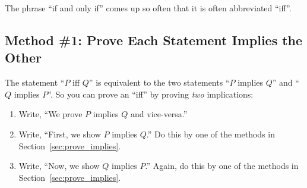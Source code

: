 The phrase ``if and only if'' comes up so often that it is often
abbreviated ``iff''.

\subsection{Method \#1:  Prove Each Statement Implies the Other}

The statement ``$P$ iff $Q$'' is equivalent to the two statements ``$P$
implies $Q$'' and ``$Q$ implies $P$''.  So you can prove an ``iff'' by
proving \textit{two} implications:
%
\begin{enumerate}
\item Write, ``We prove $P$ implies $Q$ and vice-versa.''
\item Write, ``First, we show $P$ implies $Q$.'' Do this by one
of the methods in Section~\ref{sec:prove_implies}.
\item Write, ``Now, we show $Q$ implies $P$.''  Again, do this by
one of the methods in Section~\ref{sec:prove_implies}.
\end{enumerate}

\iffalse

\subsection*{Example}

Two sets are defined to be equal if they contain the same elements; that
is, $X = Y$ means $z \in X$ if and only if $z \in Y$.  (This is actually
the first of the ZFC axioms.)  So set equality theorems can be stated and
proved as ``iff'' theorems.

\begin{theorem}[Distributive Law for Sets]
Let $A$, $B$, and $C$ be sets.  Then:
%
\[
A \cap (B \cup C) = (A \cap B) \cup (A \cap C)
\]
\end{theorem}

\begin{proof}
We show $z \in A \cap (B \cup C)$ implies $z \in (A \cap B) \cup (A
\cap C)$ and vice-versa.

First, we show $z \in A \cap (B \cup C)$ implies $z \in (A \cap B)
\cup (A \cap C)$.  Assume $z \in A \cap (B \cup C)$.  Then $z$ is in
$A$ and $z$ is also in $B$ or $C$.  Thus, $z$ is in either $A \cap B$
or $A \cap C$, which implies $z \in (A \cap B) \cup (A \cap C)$.

Second, we show $z \in (A \cap B) \cup (A \cap C)$ implies $z \in A \cap
(B \cup C)$.  Assume $z \in (A \cap B) \cup (A \cap C)$.  Then $z$ is
in both $A$ and $B$ or else $z$ is in both $A$ and $C$.  Thus, $z$ is
in $A$ and $z$ is also in $B$ or $C$.  This implies $z \in A \cap (B
\cup C)$.
\end{proof}
\fi

